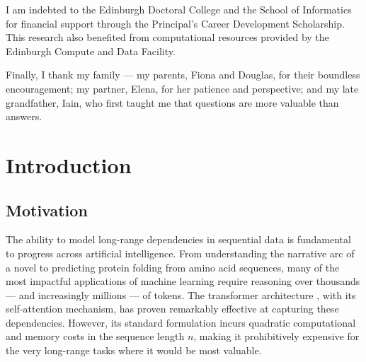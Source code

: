 \documentclass[12pt,a4paper,oneside]{book}
\begin{document}
I am indebted to the Edinburgh Doctoral College and the School of Informatics for financial
support through the Principal's Career Development Scholarship. This research also benefited
from computational resources provided by the Edinburgh Compute and Data Facility.

Finally, I thank my family — my parents, Fiona and Douglas, for their boundless encouragement;
my partner, Elena, for her patience and perspective; and my late grandfather, Iain, who first
taught me that questions are more valuable than answers.

\cleardoublepage

\tableofcontents
\cleardoublepage

\listoffigures
\cleardoublepage

\listoftables
\cleardoublepage

\mainmatter

\chapter{Introduction}

\section{Motivation}

The ability to model long-range dependencies in sequential data is fundamental to progress
across artificial intelligence. From understanding the narrative arc of a novel to predicting
protein folding from amino acid sequences, many of the most impactful applications of machine
learning require reasoning over thousands — and increasingly millions — of tokens. The
transformer architecture \cite{vaswani2017attention}, with its self-attention mechanism, has
proven remarkably effective at capturing these dependencies. However, its standard formulation
incurs quadratic computational and memory costs in the sequence length $n$, making it
prohibitively expensive for the very long-range tasks where it would be most valuable.
\end{document}
